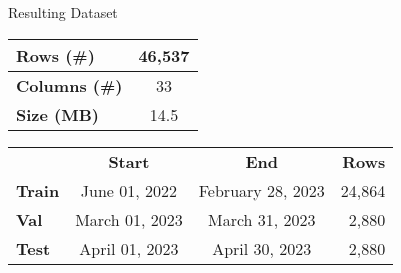 \begin{frame}{Resulting Dataset}
	\begin{table}[]
		\centering
		\begin{tabular}{l|c}
			\textbf{Rows (\#)}    & 46,537 \\
			\hline
			\textbf{Columns (\#)} & 33     \\
			\hline
			\textbf{Size (MB)}    & 14.5
		\end{tabular}
	\end{table}

	\begin{table}[]
		\centering
		\begin{tabular}{l|c|c|r}
			               & \textbf{Start} & \textbf{End}      & \textbf{Rows} \\
			\textbf{Train} & June 01, 2022  & February 28, 2023 & 24,864        \\
			\hline
			\textbf{Val}   & March 01, 2023 & March 31, 2023    & 2,880         \\
			\hline
			\textbf{Test}  & April 01, 2023 & April 30, 2023    & 2,880
		\end{tabular}
	\end{table}
\end{frame}